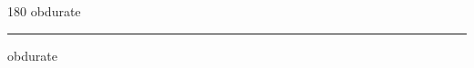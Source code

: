 
\begin{frame}
\begin{center}
\begin{turn}{180}
{\fontsize{2.5cm}{1em}\selectfont obdurate}
\end{turn}
\vspace{1em}\par  
\hrule
\vspace{1em}\par  
{\fontsize{2.5cm}{1em}\selectfont obdurate}
\end{center}
\end{frame}
